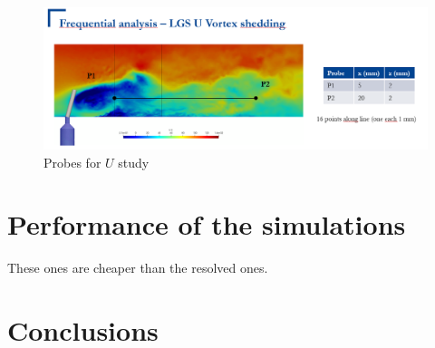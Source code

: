 \begin{figure}[h!]
	\centering
	\includegraphics[scale=0.7]{./part2_developments/figures_ch6_lagrangian_JICF/probes_U_planey0}
	\caption{Probes for $U$ study}
	\label{fig:probes_U_planey0}
\end{figure}

\section{Performance of the simulations}

These ones are cheaper than the resolved ones.



\section{Conclusions}